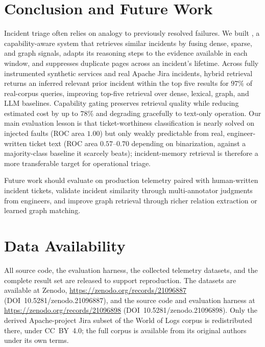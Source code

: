 \section{Conclusion and Future Work}
\label{sec:conclusion}

Incident triage often relies on analogy to previously resolved failures. We
built \sys, a capability-aware system that retrieves similar incidents by fusing
dense, sparse, and graph signals, adapts its reasoning steps to the evidence
available in each window, and suppresses duplicate pages across an incident's
lifetime. Across fully instrumented synthetic services and real Apache Jira
incidents, hybrid retrieval returns an inferred relevant prior incident within
the top five results for $97\%$ of real-corpus queries, improving top-five
retrieval over dense, lexical, graph, and LLM baselines. Capability gating
preserves retrieval quality while reducing estimated cost by up to $78\%$ and degrading
gracefully to text-only operation. Our main evaluation lesson is that
ticket-worthiness classification is nearly solved on injected faults (ROC area
$1.00$) but only weakly predictable from real, engineer-written ticket text
(ROC area $0.57$--$0.70$ depending on binarization, against a majority-class
baseline it scarcely beats); incident-memory retrieval is therefore a more
transferable target for operational triage.

Future work should evaluate \sys on production telemetry paired with
human-written incident tickets, validate incident similarity through
multi-annotator judgments from engineers, and improve graph retrieval through
richer relation extraction or learned graph matching.

\section*{Data Availability}

All source code, the evaluation harness, the collected telemetry datasets, and
the complete result set are released to support reproduction. The datasets are
available at Zenodo, \url{https://zenodo.org/records/21096887}
(DOI~10.5281/zenodo.21096887), and the source code and evaluation harness at
\url{https://zenodo.org/records/21096898}
(DOI~10.5281/zenodo.21096898). Only the derived Apache-project Jira subset of the
World of Logs corpus is redistributed there, under CC~BY~4.0; the full corpus is
available from its original authors under its own terms.